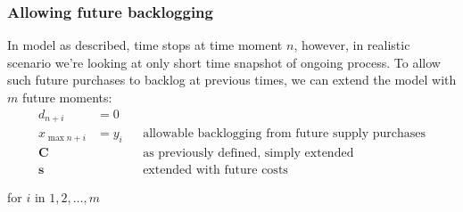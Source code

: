 \subsubsection{Allowing future backlogging}
\label{subs:Allowing future backlogging}
In model as described, time stops at time moment $n$, however, in realistic scenario we're looking at only short time snapshot of ongoing process. To allow such future purchases to backlog at previous times, we can extend the model with $m$ future moments:
\begin{align*}
    d_{n+i} &= 0  && \\
    x_{\max{n+i}} &= y_i  && \text{allowable backlogging from future supply purchases}\\
    \mathbf{C}  & && \text{as previously defined, simply extended} \\
    \mathbf{s} &&& \text{extended with future costs}
\end{align*}

for $i$ in $1, 2, \dotsc, m$
